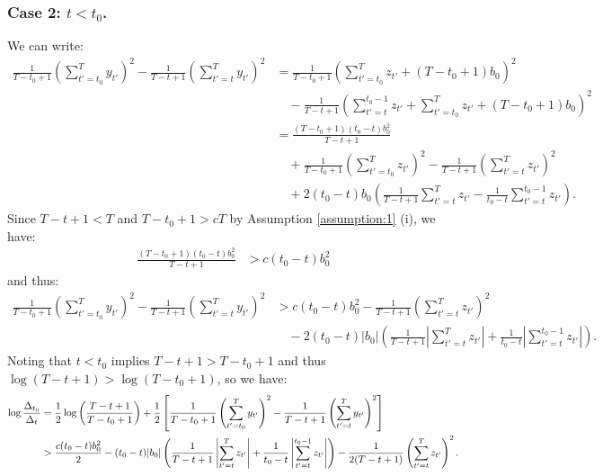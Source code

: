 \documentclass{article}
\begin{document}
\subsubsection*{Case 2: $t < t_0$.}

We can write:
\small
\begin{align*}
    \frac{1}{T-t_0+1}\left(\sum_{t'=t_0}^{T} y_{t'}\right)^2 - \frac{1}{T-t+1}\left(\sum_{t'=t}^{T} y_{t'}\right)^2 &= \frac{1}{T-t_0+1}\left(\sum_{t'=t_0}^{T} z_{t'} + (T-t_0+1)b_0\right)^2 \\
    &\quad - \frac{1}{T-t+1}\left(\sum_{t'=t}^{t_0-1} z_{t'} + \sum_{t'=t_0}^{T} z_{t'} + (T-t_0+1)b_0\right)^2 \\ 
    &= \frac{(T-t_0+1)(t_0 - t) b_0^2}{T-t+1} \\
    &\quad + \frac{1}{T-t_0+1}\left(\sum_{t'=t_0}^{T} z_{t'}\right)^2 -\frac{1}{T-t+1}\left(\sum_{t'=t}^{T} z_{t'}\right)^2\\
    &\quad  + 2(t_0 - t) b_0\left(\frac{1}{T-t+1}\sum_{t'=t}^{T} z_{t'} - \frac{1}{t_0-t}\sum_{t'=t}^{t_0-1} z_{t'}\right).
\end{align*}
\normalsize
Since $T-t+1 < T$ and $T - t_0 + 1 > cT$ by Assumption \ref{assumption:1} (i), we have:
\begin{align*}
    \frac{(T - t_0 + 1)(t_0-t)b_0^2}{T-t+1} &> c (t_0-t) b_0^2 
\end{align*}
and thus:
\begin{align*}
    \frac{1}{T-t_0+1}\left(\sum_{t'=t_0}^{T} y_{t'}\right)^2 - \frac{1}{T-t+1}\left(\sum_{t'=t}^{T} y_{t'}\right)^2 &> c(t_0 - t)b_0^2 -\frac{1}{T-t+1}\left(\sum_{t'=t}^{T} z_{t'}\right)^2\\
    &\quad  - 2(t_0 - t) |b_0|\left(\frac{1}{T-t+1}\left|\sum_{t'=t}^{T} z_{t'}\right| + \frac{1}{t_0-t}\left|\sum_{t'=t}^{t_0-1} z_{t'}\right|\right).
\end{align*}
Noting that $t < t_0$ implies $T - t + 1 > T - t_0 + 1$ and thus $ \log (T-t+1) > \log(T-t_0+1)$, so we have:
\small
\begin{align*}
    \log \frac{\Delta_{t_0}}{\Delta_t} &= \frac{1}{2} \log \left(\frac{T-t+1}{T-t_0+1}\right) + \frac{1}{2} \left[\frac{1}{T-t_0+1}\left(\sum_{t'=t_0}^{T} y_{t'}\right)^2- \frac{1}{T-t+1}\left(\sum_{t'=t}^{T} y_{t'}\right)^2\right] \notag \\
    &> \frac{c (t_0-t)b_0^2 }{2} - (t_0 -t) |b_0| \left(\frac{1}{T-t+1}\left|\sum_{t'=t}^{T} z_{t'}\right| + \frac{1}{t_0-t}\left|\sum_{t'=t}^{t_0-1} z_{t'}\right|\right) -\frac{1}{2(T-t+1)}\left(\sum_{t'=t}^{T} z_{t'}\right)^2.
\end{align*}
\end{document}
